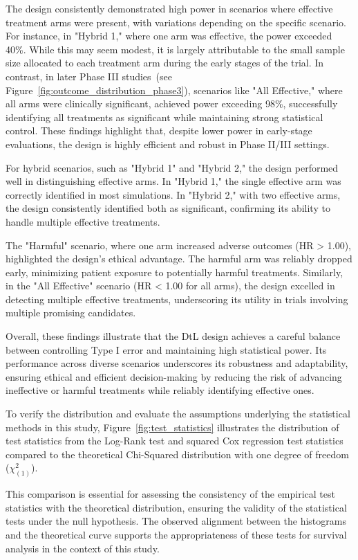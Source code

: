 \documentclass[11pt, a4paper]{article}\usepackage[]{graphicx}\usepackage[]{xcolor}
\begin{document}
The design consistently demonstrated high power in scenarios where effective treatment arms were present, with variations depending on the specific scenario. For instance, in "Hybrid 1," where one arm was effective, the power exceeded 40\%. While this may seem modest, it is largely attributable to the small sample size allocated to each treatment arm during the early stages of the trial. In contrast, in later Phase III studies~(see Figure~\ref{fig:outcome_distribution_phase3}), scenarios like "All Effective," where all arms were clinically significant, achieved power exceeding 98\%, successfully identifying all treatments as significant while maintaining strong statistical control. These findings highlight that, despite lower power in early-stage evaluations, the design is highly efficient and robust in Phase II/III settings.

For hybrid scenarios, such as "Hybrid 1" and "Hybrid 2," the design performed well in distinguishing effective arms. In "Hybrid 1," the single effective arm was correctly identified in most simulations. In "Hybrid 2," with two effective arms, the design consistently identified both as significant, confirming its ability to handle multiple effective treatments.

The "Harmful" scenario, where one arm increased adverse outcomes (HR > 1.00), highlighted the design's ethical advantage. The harmful arm was reliably dropped early, minimizing patient exposure to potentially harmful treatments. Similarly, in the "All Effective" scenario (HR < 1.00 for all arms), the design excelled in detecting multiple effective treatments, underscoring its utility in trials involving multiple promising candidates.

Overall, these findings illustrate that the DtL design achieves a careful balance between controlling Type I error and maintaining high statistical power. Its performance across diverse scenarios underscores its robustness and adaptability, ensuring ethical and efficient decision-making by reducing the risk of advancing ineffective or harmful treatments while reliably identifying effective ones.

To verify the distribution and evaluate the assumptions underlying the statistical methods in this study, Figure~\ref{fig:test_statistics} illustrates the distribution of test statistics from the Log-Rank test and squared Cox regression test statistics compared to the theoretical Chi-Squared distribution with one degree of freedom (\( \chi^2_{(1)} \)).

This comparison is essential for assessing the consistency of the empirical test statistics with the theoretical distribution, ensuring the validity of the statistical tests under the null hypothesis. The observed alignment between the histograms and the theoretical curve supports the appropriateness of these tests for survival analysis in the context of this study.
\end{document}

